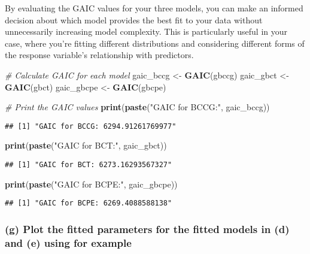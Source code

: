 \documentclass[
]{article}
\newenvironment{Shaded}{\begin{snugshade}}{\end{snugshade}}
\newcommand{\CommentTok}[1]{\textcolor[rgb]{0.56,0.35,0.01}{\textit{#1}}}
\newcommand{\FunctionTok}[1]{\textcolor[rgb]{0.13,0.29,0.53}{\textbf{#1}}}
\newcommand{\NormalTok}[1]{#1}
\newcommand{\OtherTok}[1]{\textcolor[rgb]{0.56,0.35,0.01}{#1}}
\newcommand{\StringTok}[1]{\textcolor[rgb]{0.31,0.60,0.02}{#1}}
\begin{document}
By evaluating the GAIC values for your three models, you can make an
informed decision about which model provides the best fit to your data
without unnecessarily increasing model complexity. This is particularly
useful in your case, where you're fitting different distributions and
considering different forms of the response variable's relationship with
predictors.

\begin{Shaded}
\begin{Highlighting}[]
\CommentTok{\# Calculate GAIC for each model}
\NormalTok{gaic\_bccg }\OtherTok{\textless{}{-}} \FunctionTok{GAIC}\NormalTok{(gbccg)}
\NormalTok{gaic\_gbct }\OtherTok{\textless{}{-}} \FunctionTok{GAIC}\NormalTok{(gbct)}
\NormalTok{gaic\_gbcpe }\OtherTok{\textless{}{-}} \FunctionTok{GAIC}\NormalTok{(gbcpe)}

\CommentTok{\# Print the GAIC values}
\FunctionTok{print}\NormalTok{(}\FunctionTok{paste}\NormalTok{(}\StringTok{"GAIC for BCCG:"}\NormalTok{, gaic\_bccg))}
\end{Highlighting}
\end{Shaded}

\begin{verbatim}
## [1] "GAIC for BCCG: 6294.91261769977"
\end{verbatim}

\begin{Shaded}
\begin{Highlighting}[]
\FunctionTok{print}\NormalTok{(}\FunctionTok{paste}\NormalTok{(}\StringTok{"GAIC for BCT:"}\NormalTok{, gaic\_gbct))}
\end{Highlighting}
\end{Shaded}

\begin{verbatim}
## [1] "GAIC for BCT: 6273.16293567327"
\end{verbatim}

\begin{Shaded}
\begin{Highlighting}[]
\FunctionTok{print}\NormalTok{(}\FunctionTok{paste}\NormalTok{(}\StringTok{"GAIC for BCPE:"}\NormalTok{, gaic\_gbcpe))}
\end{Highlighting}
\end{Shaded}

\begin{verbatim}
## [1] "GAIC for BCPE: 6269.4088588138"
\end{verbatim}

\hypertarget{g-plot-the-fitted-parameters-for-the-fitted-models-in-d-and-e-using-for-example}{%
\subsubsection{(g) Plot the fitted parameters for the fitted models in
(d) and (e) using for
example}\label{g-plot-the-fitted-parameters-for-the-fitted-models-in-d-and-e-using-for-example}}
\end{document}

